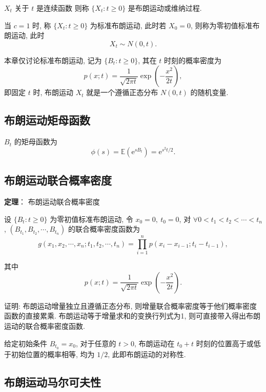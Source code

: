 \documentclass[openany]{ctexbook}
\theoremstyle{kaiti}
\theoremstyle{normal}
\begin{document}
$X_t$ 关于 $t$ 是连续函数
则称 $\{X_t:t\geqslant0\}$ 是布朗运动或维纳过程.

当 $c=1$ 时, 称 $\{X_t:t\geqslant0\}$ 为标准布朗运动, 此时若 $X_0=0$, 则称为零初值标准布朗运动, 此时
\begin{equation}
  X_t\sim N(0,t).
\end{equation}

本章仅讨论标准布朗运动, 记为 $\{B_t:t\geqslant0\}$, 其在 $t$ 时刻的概率密度为
\begin{equation}
  p(x;t)=\frac{1}{\sqrt{2\pi t}}\exp\left(-\frac{x^2}{2t}\right),
\end{equation}
即固定 $t$ 时, 布朗运动 $X_t$ 就是一个遵循正态分布 $N(0,t)$ 的随机变量.

\subsection{布朗运动矩母函数}

$B_t$ 的矩母函数为
\begin{equation}
  \phi(s)=\mathbb{E}(\mathrm{e}^{sB_t})=\mathrm{e}^{s^2t/2}.
\end{equation}

\subsection{布朗运动联合概率密度}

\textbf{定理}： 布朗运动联合概率密度

设 $\{B_t:t\geqslant0\}$ 为零初值标准布朗运动, 令 $x_0=0,~t_0=0$, 对 $\forall 0<t_1<t_2<\cdots<t_n$, $(B_{t_1},B_{t_2},\cdots,B_{t_n})$ 的联合概率密度函数为
\begin{equation}
  g(x_1,x_2,\cdots,x_n;t_1,t_2,\cdots,t_n)=\prod_{i=1}^np(x_i-x_{i-1};t_i-t_{i-1}),
\end{equation}

其中
\begin{equation}
  p(x;t)=\frac{1}{\sqrt{2\pi t}}\exp\left(-\frac{x^2}{2t}\right).
\end{equation}

证明: 布朗运动增量独立且遵循正态分布, 则增量联合概率密度等于他们概率密度函数的直接累乘. 布朗运动等于增量求和的变换行列式为1, 则可直接带入得出布朗运动的联合概率密度函数.

给定初始条件 $B_{t_0}=x_0$, 对于任意的 $t>0$, 布朗运动在 $t_0+t$ 时刻的位置高于或低于初始位置的概率相等, 均为 $1/2$, 此即布朗运动的对称性.

\subsection{布朗运动马尔可夫性}
\end{document}

